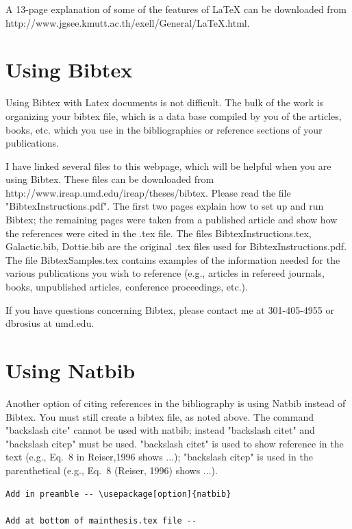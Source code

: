 A 13-page explanation of some of the features of LaTeX can be downloaded from http://www.jgsee.kmutt.ac.th/exell/General/LaTeX.html.


\section{Using Bibtex}

Using Bibtex with Latex documents is not difficult.  The bulk of the work is organizing your bibtex file, which is a data base compiled by you of the articles, books, etc. which you use in the bibliographies or reference sections of your publications.  

I have linked several files to this webpage, which will be helpful when you are using Bibtex.  These files can be downloaded from \newline
http://www.ireap.umd.edu/ireap/theses/bibtex.  Please read the file "BibtexInstructions.pdf".  The first two pages explain how to set up and run Bibtex; the remaining pages were taken from a published article and show how the references were cited in the .tex file.   The files BibtexInstructions.tex, Galactic.bib, Dottie.bib are the original .tex files used for BibtexInstructions.pdf.  The file BibtexSamples.tex contains examples of the information needed for the various publications you wish to reference (e.g., articles in refereed journals, books, unpublished articles, conference proceedings, etc.).

If you have questions concerning Bibtex, please contact me at 301-405-4955 or dbrosius at umd.edu.

\section{Using Natbib}

Another option of citing references in the bibliography is using Natbib instead of Bibtex.  You must still create a bibtex file, as noted above.  The command "backslash cite" cannot be used with natbib; instead "backslash citet" and "backslash citep" must be used.    "backslash citet" is used to show reference in the text (e.g., Eq.\ 8 in Reiser,1996 shows ...); "backslash citep" is used in the parenthetical (e.g., Eq.\ 8 (Reiser, 1996) shows ...).  

\begin{verbatim}
Add in preamble -- \usepackage[option]{natbib} 

Add at bottom of mainthesis.tex file --


\end{verbatim}

